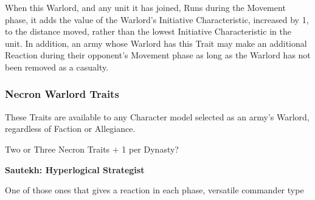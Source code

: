 \begin{multicols}{2}
\vspace*{1em}
When this Warlord, and any unit it has joined, Runs
during the Movement phase, it adds the value of the
Warlord’s Initiative Characteristic, increased by 1, to
the distance moved, rather than the lowest Initiative
Characteristic in the unit. In addition, an army whose
Warlord has this Trait may make an additional Reaction
during their opponent’s Movement phase as long as the
Warlord has not been removed as a casualty.

\end{multicols}

\subsubsection{Necron Warlord Traits}
These Traits are available to any Character model selected as an army’s Warlord, regardless of Faction or Allegiance.

\begin{multicols}{2}
	
	Two or Three Necron Traits + 1 per Dynasty?
	
	\textbf{Sautekh: Hyperlogical Strategist}
	
	One of those ones that gives a reaction in each phase, versatile commander type
	
\end{multicols}
